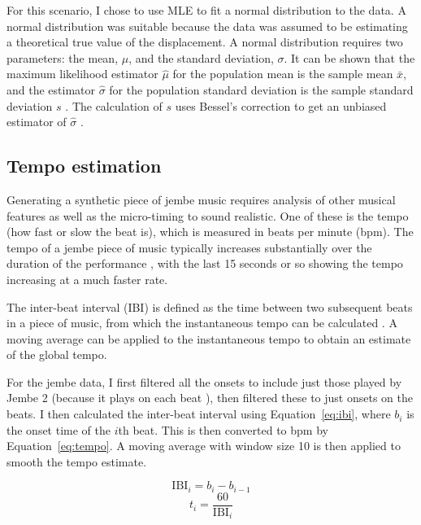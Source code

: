 \documentclass[12pt,twoside,openright]{report}
\begin{document}
For this scenario, I chose to use MLE to fit a normal distribution to the data.
A normal distribution was suitable because the data was assumed to be estimating
a theoretical true value of the displacement. A normal distribution requires two
parameters: the mean, $\mu$, and the standard deviation, $\sigma$. It can be shown that the maximum likelihood estimator $\hat{\mu}$ for the population mean is the sample mean $\bar{x}$, and the estimator $\hat{\sigma}$ for the population standard deviation is the sample standard deviation $s$ \cite{dekking2005}. The calculation of $s$ uses Bessel's
correction to get an unbiased estimator of $\hat{\sigma}$ \cite{upton2014}.


\subsection{Tempo estimation} \label{tempo_estimation}

Generating a synthetic piece of jembe music requires analysis of other musical
features as well as the micro-timing to sound realistic. One of these is the
tempo (how fast or slow the beat is), which is measured in beats per minute
(bpm). The tempo of a jembe piece of music typically increases substantially
over the duration of the performance \cite{jacoby2021}, with the last 15 seconds or
so showing the tempo increasing at a much faster rate.

The inter-beat interval (IBI) is defined as the time between two subsequent beats in a
piece of music, from which the instantaneous tempo can be calculated \cite{dixon2001}.
A moving average can be applied to the instantaneous tempo to obtain an estimate
of the global tempo.

For the jembe data, I first filtered all the onsets to include just those played
by Jembe 2 (because it plays on each beat \cite{jacoby2021}), then filtered these to
just onsets on the beats. I then calculated the inter-beat interval using Equation~\ref{eq:ibi}, where $b_i$ is the onset time of the $i$th beat. This is then converted to bpm by Equation~\ref{eq:tempo}. A moving average with window size 10 is then applied to smooth the tempo estimate.

\begin{equation}
    \mathrm{IBI}_i = b_i - b_{i-1}
    \label{eq:ibi}
\end{equation}
\begin{equation}
    t_i = \frac{60}{\mathrm{IBI}_i}
    \label{eq:tempo}
\end{equation}
\end{document}
